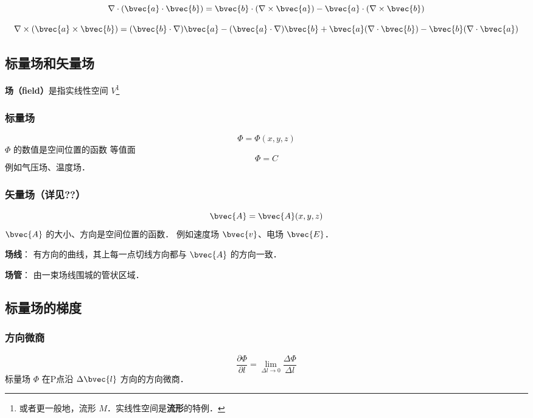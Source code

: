 \begin{equation}
\nabla\cdot(\bvec{a}\cdot\bvec{b})=\bvec{b}\cdot(\nabla\times\bvec{a})-\bvec{a}\cdot(\nabla\times\bvec{b})
\end{equation}

\begin{equation}
\nabla\times(\bvec{a}\times\bvec{b})=(\bvec{b}\cdot\nabla)\bvec{a}-(\bvec{a}\cdot\nabla)\bvec{b}+\bvec{a}(\nabla\cdot\bvec{b})-\bvec{b}(\nabla\cdot\bvec{a})
\end{equation}






\subsection{标量场和矢量场}

\textbf{场（field）}是指实线性空间 $V$\footnote{或者更一般地，流形 $M$．实线性空间是\textbf{流形}的特例．}

\subsubsection{标量场}
\begin{equation}\label{VecAnl_eq1}
\Phi=\Phi(x,y,z)
\end{equation}
 $\Phi$ 的数值是空间位置的函数
 等值面
\begin{equation}\label{VecAnl_eq2}
\Phi=C
\end{equation}
 例如气压场、温度场．
\subsubsection{矢量场（详见??）}%
\begin{equation}\label{VecAnl_eq3}
\bvec {A}= \bvec{A}(x,y,z)
\end{equation}
$\bvec{A}$ 的大小、方向是空间位置的函数．
例如速度场 $\bvec{v}$、电场 $\bvec{E}$．

\textbf{场线}： 有方向的曲线，其上每一点切线方向都与 $\bvec{A}$ 的方向一致．

\textbf{场管}： 由一束场线围城的管状区域．

\subsection{标量场的梯度}%
\subsubsection{方向微商}
\begin{equation}\label{VecAnl_eq4}
\frac{\partial \Phi}{\partial l}=\lim_{\Delta l \to 0}\frac{\Delta \Phi}{\Delta l}
\end{equation}
标量场 $\Phi$ 在P点沿 $\Delta \bvec{l} $ 方向的方向微商．

